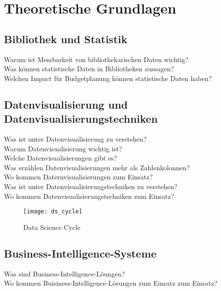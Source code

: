 \chapter{Theoretische Grundlagen}

\section{Bibliothek und Statistik}

Warum ist Messbarkeit von bibliothekarischen Daten wichtig?\\
Was können statistische Daten in Bibliotheken aussagen?\\
Welchen Impact für Budgetplanung können statistische Daten haben?


\section{Datenvisualisierung und Datenvisualisierungstechniken}
Was ist unter Datenvisualisierung zu verstehen?\\
Warum Datenvisualisierung wichtig ist?\\
Welche Datenvisualisierungen gibt es?\\
Was erzählen Datenvisualisierungen mehr als Zahlenkolonnen?\\
Wo kommen Daternvisualisierungen zum Einsatz?\\
Was ist unter Datenvisualisierungstechniken zu verstehen?\\
Wo kommen Datenvisualisierungstechniken zum Einsatz?


\begin{figure}[h]
    \centering
        \texttt{[image: ds\_cycle]}
        \caption{Data Science Cycle}
        \label{fig:data science}
\end{figure}




\section{Business-Intelligence-Systeme}

Was sind Business-Intelligence-Löungen?\\
Wo kommen Buisiness-Intelligence-Lösungen zum Einsatz zum Einsatz?
